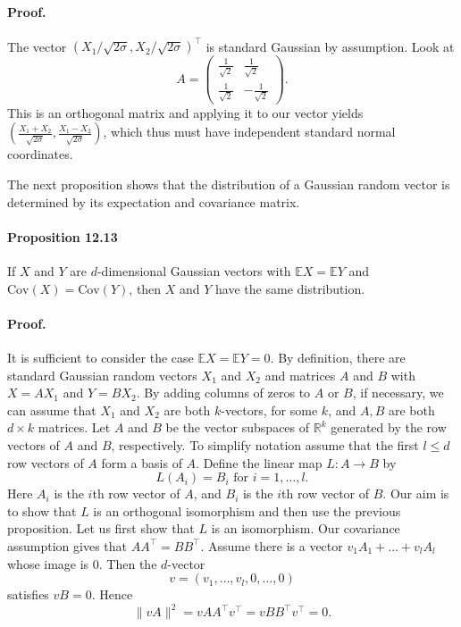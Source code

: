 \documentclass{article}
\begin{document}
\paragraph{Proof.} The vector $(X_1/\sqrt{2\sigma}, X_2/\sqrt{2\sigma})^\top$ is standard Gaussian by assumption. Look at
\[
A = \begin{pmatrix} \frac{1}{\sqrt{2}} & \frac{1}{\sqrt{2}} \\ \frac{1}{\sqrt{2}} & -\frac{1}{\sqrt{2}} \end{pmatrix}.
\]
This is an orthogonal matrix and applying it to our vector yields $\left(\frac{X_1 + X_2}{\sqrt{2\sigma}}, \frac{X_1 - X_2}{\sqrt{2\sigma}}\right)$, which thus must have independent standard normal coordinates.

The next proposition shows that the distribution of a Gaussian random vector is determined by its expectation and covariance matrix.

\paragraph{Proposition 12.13} If $X$ and $Y$ are $d$-dimensional Gaussian vectors with $\mathbb{E}X = \mathbb{E}Y$ and $\text{Cov}(X) = \text{Cov}(Y)$, then $X$ and $Y$ have the same distribution.

\paragraph{Proof.} It is sufficient to consider the case $\mathbb{E}X = \mathbb{E}Y = 0$. By definition, there are standard Gaussian random vectors $X_1$ and $X_2$ and matrices $A$ and $B$ with $X = AX_1$ and $Y = BX_2$. By adding columns of zeros to $A$ or $B$, if necessary, we can assume that $X_1$ and $X_2$ are both $k$-vectors, for some $k$, and $A, B$ are both $d \times k$ matrices. Let $A$ and $B$ be the vector subspaces of $\mathbb{R}^k$ generated by the row vectors of $A$ and $B$, respectively. To simplify notation assume that the first $l \leq d$ row vectors of $A$ form a basis of $A$. Define the linear map $L : A \rightarrow B$ by
\[
L(A_i) = B_i \text{ for } i = 1, \ldots, l.
\]
Here $A_i$ is the $i$th row vector of $A$, and $B_i$ is the $i$th row vector of $B$. Our aim is to show that $L$ is an orthogonal isomorphism and then use the previous proposition. Let us first show that $L$ is an isomorphism. Our covariance assumption gives that $AA^\top = BB^\top$. Assume there is a vector $v_1 A_1 + \ldots + v_l A_l$ whose image is 0. Then the $d$-vector
\[
v = (v_1, \ldots, v_l, 0, \ldots, 0)
\]
satisfies $vB = 0$. Hence
\[
\|vA\|^2 = vAA^\top v^\top = vBB^\top v^\top = 0.
\]
\end{document}
